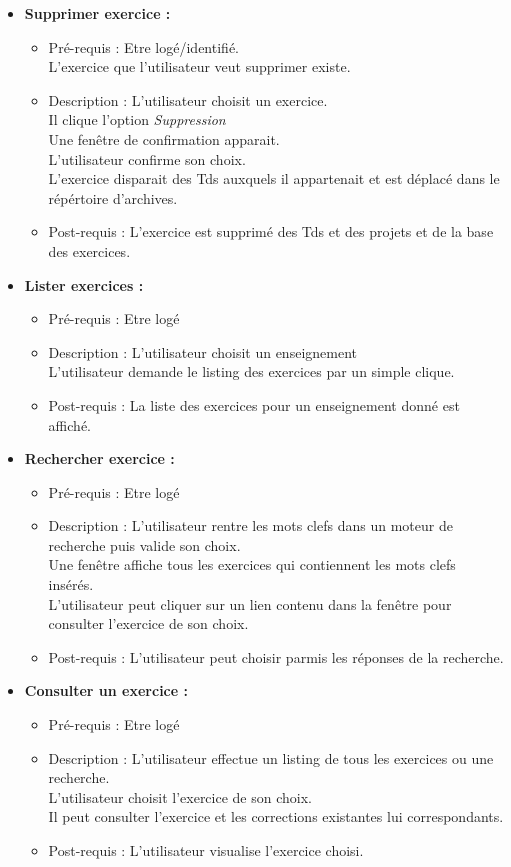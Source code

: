 \begin{itemize}
\item  {\bf Supprimer exercice :}
	\begin{itemize}
	\item Pr{\'e}-requis : Etre log{\'e}/identifi{\'e}.\\
	L'exercice que l'utilisateur veut supprimer existe.	
	\item Description : L'utilisateur choisit un exercice.\\
	Il clique l'option {\it Suppression}\\
	Une fen{\^e}tre de confirmation apparait.\\
	L'utilisateur confirme son choix.\\
	L'exercice disparait des Tds auxquels il appartenait et est d{\'e}plac{\'e} dans le r{\'e}p{\'e}rtoire d'archives.
	\item Post-requis : L'exercice est supprim{\'e} des Tds et des projets et de la base des exercices.
	\end{itemize}

\item  {\bf Lister exercices :}
	\begin{itemize}
	\item Pr{\'e}-requis : Etre log{\'e}
	\item Description : L'utilisateur choisit un enseignement\\
	L'utilisateur demande le listing des exercices par un simple clique.
	\item Post-requis : La liste des exercices pour un enseignement donn{\'e} est affich{\'e}.
	\end{itemize}


\item  {\bf Rechercher exercice :}
	\begin{itemize}
	\item Pr{\'e}-requis : Etre log{\'e}
	\item Description : L'utilisateur rentre les mots clefs dans un moteur de recherche puis valide son choix.\\
	Une fen{\^e}tre affiche tous les exercices qui contiennent les mots clefs ins{\'e}r{\'e}s.\\
	L'utilisateur peut cliquer sur un lien contenu dans la fen{\^e}tre pour consulter l'exercice de son choix.
	\item Post-requis : L'utilisateur peut choisir parmis les r{\'e}ponses de la recherche.
	\end{itemize}

\item  {\bf Consulter un exercice :}
	\begin{itemize}
	\item Pr{\'e}-requis : Etre log{\'e}
	\item Description : L'utilisateur effectue un listing de tous les exercices ou une recherche.\\
	L'utilisateur choisit l'exercice de son choix.\\
	Il peut consulter l'exercice et les corrections existantes lui correspondants.
	\item Post-requis : L'utilisateur visualise l'exercice choisi.\\
	\end{itemize}
\end{itemize}
